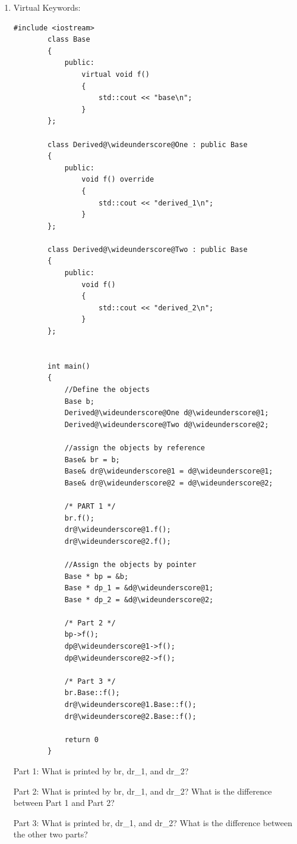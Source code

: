 \documentclass{article}
\begin{document}
\begin{enumerate}[label=(\alph*), itemsep = 120pt]
\begin{lstlisting}[style = CStyle]
        free(gabriel@\wideunderscore@company);
    \end{lstlisting}

    Whenever the above code is executed, a memory leak occurs. /textbf{Explain what a memory leak is and come up with one line of code that can be added above to fix the memory leak.}

    \item Virtual Keywords:
    \begin{lstlisting}[style = CStyle]
        #include <iostream>
        class Base
        {
            public: 
                virtual void f()
                {
                    std::cout << "base\n";
                }
        };

        class Derived@\wideunderscore@One : public Base
        {
            public:
                void f() override
                {
                    std::cout << "derived_1\n";
                }
        };

        class Derived@\wideunderscore@Two : public Base 
        {
            public: 
                void f()
                {
                    std::cout << "derived_2\n";
                }
        };

    
        int main()
        {
            //Define the objects
            Base b;
            Derived@\wideunderscore@One d@\wideunderscore@1;
            Derived@\wideunderscore@Two d@\wideunderscore@2;

            //assign the objects by reference
            Base& br = b;
            Base& dr@\wideunderscore@1 = d@\wideunderscore@1;
            Base& dr@\wideunderscore@2 = d@\wideunderscore@2;

            /* PART 1 */
            br.f();
            dr@\wideunderscore@1.f();
            dr@\wideunderscore@2.f();

            //Assign the objects by pointer
            Base * bp = &b;
            Base * dp_1 = &d@\wideunderscore@1;
            Base * dp_2 = &d@\wideunderscore@2;

            /* Part 2 */
            bp->f();
            dp@\wideunderscore@1->f();
            dp@\wideunderscore@2->f();

            /* Part 3 */
            br.Base::f();
            dr@\wideunderscore@1.Base::f();
            dr@\wideunderscore@2.Base::f();

            return 0
        }
    \end{lstlisting}
    Part 1:
    What is printed by br, dr\_1, and dr\_2?

    \vspace{2cm}
    Part 2:
    What is printed by br, dr\_1, and dr\_2? What is the difference between Part 1 and Part 2?

    \vspace{2cm}
    Part 3:
    What is printed br, dr\_1, and dr\_2? What is the difference between the other two parts?
    \vspace{2cm}
    
    \end{enumerate}


    
\end{document}
